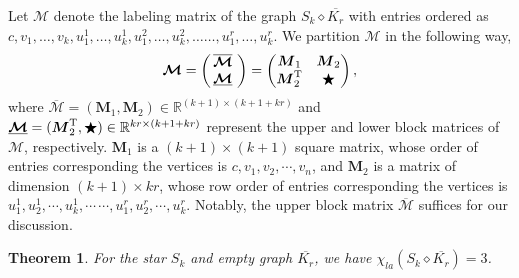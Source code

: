 \documentclass[12pt]{article}
\newtheorem{theorem}{Theorem}[section]
\begin{document}
Let $\boldsymbol{\mathcal{M}}$ denote the labeling matrix of the graph $S_{k}\diamond \overline{K_{r}}$ with entries ordered as $c,v_{1},\ldots,v_{k},u_{1}^{1},\ldots,u_{k}^{1},u_{1}^{2},\ldots,u_{k}^{2},\ldots\ldots,u_{1}^{r},\ldots,u_{k}^{r}$. We partition $\boldsymbol{\mathcal{M}}$ in the following way,
\begin{equation*}
\boldsymbol{\mathcal{M}}=\begin{pmatrix}
\,\overline{\boldsymbol{\mathcal{M}}}\,\, \\  \,\underline{\boldsymbol{\mathcal{M}}}\,\,
\end{pmatrix}
=\begin{pmatrix}
  \boldsymbol{M}_{1}& \boldsymbol{M}_{2} \\
  \boldsymbol{M}_{2}^{\rm{T}} & \bigstar
\end{pmatrix},
\end{equation*}
where $\overline{\boldsymbol{\mathcal{M}}}=(\boldsymbol{M}_{1},\boldsymbol{M}_{2}) \in\mathbb{R}^{(k+1)\times (k+1+kr)}$ and $\underline{\boldsymbol{\mathcal{M}}}=(\boldsymbol{M}_{2}^{\rm{T}},\bigstar) \in\mathbb{R}^{kr\times (k+1+kr)}$ represent the upper and lower block matrices of $\boldsymbol{\mathcal{M}}$, respectively. $\boldsymbol{M}_{1}$ is a $(k+1)\times (k+1)$ square matrix, whose order of entries corresponding the vertices is $c,v_{1},v_{2},\cdots,v_{n}$, and $\boldsymbol{M}_{2}$ is a matrix of dimension $(k+1)\times kr$, whose row order of entries corresponding the vertices is $u_{1}^{1},u_{2}^{1},\cdots,u_{k}^{1},\cdots\,\cdots,u_{1}^{r},u_{2}^{r},\cdots,u_{k}^{r}$.
Notably, the upper block matrix $\overline{\boldsymbol{\mathcal{M}}}$ suffices for our discussion.

\begin{theorem}\label{th1}
For the star $S_{k}$ and empty graph $\overline{K_{r}}$, we have $\chi_{la}(S_{k}\diamond \overline{K_{r}})=3$.
\end{theorem}
\end{document}
